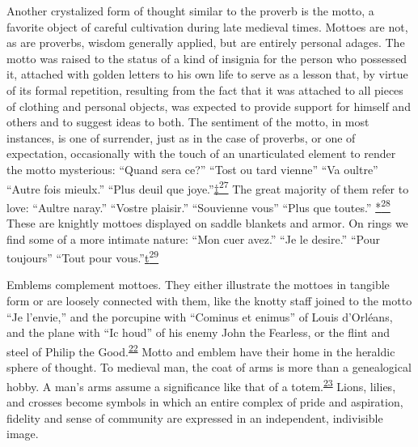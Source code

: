 Another crystalized form of thought similar to the proverb is the motto,
a favorite object of careful cultivation during late medieval times.
Mottoes are not, as are proverbs, wisdom generally applied, but are
entirely personal adages. The motto was raised to the status of a kind
of insignia for the person who possessed it, attached with golden
letters to his own life to serve as a lesson that, by virtue of its
formal repetition, resulting from the fact that it was attached to all
pieces of clothing and personal objects, was expected to provide support
for himself and others and to suggest ideas to both. The sentiment of
the motto, in most instances, is one of surrender, just as in the case
of proverbs, or one of expectation, occasionally with the touch of an
unarticulated element to render the motto mysterious: ``Quand sera ce?''
``Tost ou tard vienne'' ``Va oultre'' ``Autre fois mieulx.'' ``Plus
deuil que
joye.''\protect\hypertarget{18_Chapter_Eleven__THE_FORMS_OF_THO.xhtmlux5cux23id_2617}{\protect\hyperlink{23_NOTES.xhtmlux5cux23id_2618}{‡\textsuperscript{27}}}
The great majority of them refer to love: ``Aultre naray.'' ``Vostre
plaisir.''
\protect\hypertarget{18_Chapter_Eleven__THE_FORMS_OF_THO.xhtmlux5cux23page_276}{}{}``Souvienne
vous'' ``Plus que toutes.''
\protect\hypertarget{18_Chapter_Eleven__THE_FORMS_OF_THO.xhtmlux5cux23id_2619}{\protect\hyperlink{23_NOTES.xhtmlux5cux23id_2620}{*\textsuperscript{28}}}
These are knightly mottoes displayed on saddle blankets and armor. On
rings we find some of a more intimate nature: ``Mon cuer avez.'' ``Je le
desire.'' ``Pour toujours'' ``Tout pour
vous.''\protect\hypertarget{18_Chapter_Eleven__THE_FORMS_OF_THO.xhtmlux5cux23id_2621}{\protect\hyperlink{23_NOTES.xhtmlux5cux23id_2622}{t\textsuperscript{29}}}

Emblems complement mottoes. They either illustrate the mottoes in
tangible form or are loosely connected with them, like the knotty staff
joined to the motto ``Je l'envie,'' and the porcupine with ``Cominus et
enimus'' of Louis d'Orléans, and the plane with ``Ic houd'' of his enemy
John the Fearless, or the flint and steel of Philip the
Good.\textsuperscript{\protect\hypertarget{18_Chapter_Eleven__THE_FORMS_OF_THO.xhtmlux5cux23id_588}{\protect\hyperlink{23_NOTES.xhtmlux5cux23id_589}{22}}}
Motto and emblem have their home in the heraldic sphere of thought. To
medieval man, the coat of arms is more than a genealogical hobby. A
man's arms assume a significance like that of a
totem.\textsuperscript{\protect\hypertarget{18_Chapter_Eleven__THE_FORMS_OF_THO.xhtmlux5cux23id_586}{\protect\hyperlink{23_NOTES.xhtmlux5cux23id_587}{23}}}
Lions, lilies, and crosses become symbols in which an entire complex of
pride and aspiration, fidelity and sense of community are expressed in
an independent, indivisible image.

